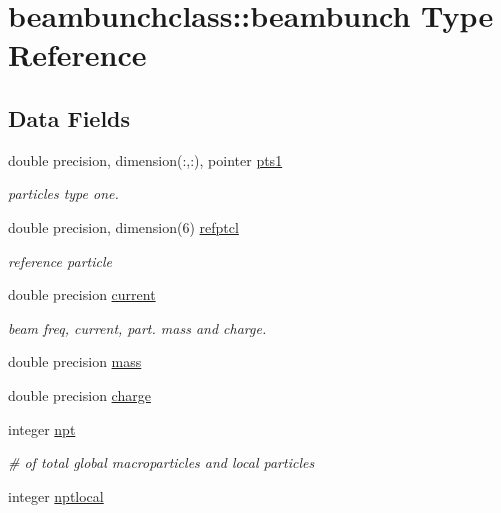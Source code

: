 \hypertarget{structbeambunchclass_1_1beambunch}{}\section{beambunchclass\+::beambunch Type Reference}
\label{structbeambunchclass_1_1beambunch}
\subsection*{Data Fields}
\begin{DoxyCompactItemize}
\item 
double precision, dimension(\+:,\+:), pointer \mbox{\hyperlink{structbeambunchclass_1_1beambunch_af0d19c1e3e537ade010af8554783c8d7}{pts1}}
\begin{DoxyCompactList}\small\item\em particles type one. \end{DoxyCompactList}\item 
double precision, dimension(6) \mbox{\hyperlink{structbeambunchclass_1_1beambunch_a973e0e4ee1b24185bac1d727d2c074f5}{refptcl}}
\begin{DoxyCompactList}\small\item\em reference particle \end{DoxyCompactList}\end{DoxyCompactItemize}
\textbf{ }\par
\begin{DoxyCompactItemize}
\item 
double precision \mbox{\hyperlink{structbeambunchclass_1_1beambunch_a0611d8fb67f60eb1ea7a3df79c5de915}{current}}
\begin{DoxyCompactList}\small\item\em beam freq, current, part. mass and charge. \end{DoxyCompactList}\item 
double precision \mbox{\hyperlink{structbeambunchclass_1_1beambunch_abeaad3b1ce823a9c49cab5a8b96f5ff0}{mass}}
\item 
double precision \mbox{\hyperlink{structbeambunchclass_1_1beambunch_a555bb0dc53871a3f69755125598c8938}{charge}}
\end{DoxyCompactItemize}

\textbf{ }\par
\begin{DoxyCompactItemize}
\item 
integer \mbox{\hyperlink{structbeambunchclass_1_1beambunch_a20f5303645e1b7fa0cbfa88f81cda947}{npt}}
\begin{DoxyCompactList}\small\item\em \# of total global macroparticles and local particles \end{DoxyCompactList}\item 
integer \mbox{\hyperlink{structbeambunchclass_1_1beambunch_a71a8687235fdc19d862fb13092b714a3}{nptlocal}}
\end{DoxyCompactItemize}



